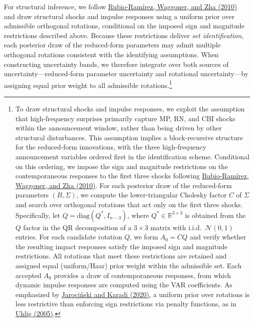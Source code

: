 \documentclass[12pt, reqno]{article}
\begin{document}
For structural inference, we follow \hyperlink{Rubio-Ramirez et al. (2010)}{Rubio-Ramírez, Waggoner, and Zha (2010)} and draw structural shocks and impulse responses using a uniform prior over admissible orthogonal rotations, conditional on the imposed sign and magnitude restrictions described above. Because these restrictions deliver \emph{set identification}, each posterior draw of the reduced-form parameters may admit multiple orthogonal rotations consistent with the identifying assumptions. When constructing uncertainty bands, we therefore integrate over both sources of uncertainty—reduced-form parameter uncertainty and rotational uncertainty—by assigning equal prior weight to all admissible rotations.\footnote{To draw structural shocks and impulse responses, we exploit the assumption that high-frequency surprises primarily capture MP, RN, and CBI shocks within the announcement window, rather than being driven by other structural disturbances. This assumption implies a block-recursive structure for the reduced-form innovations, with the three high-frequency announcement variables ordered first in the identification scheme. Conditional on this ordering, we impose the sign and magnitude restrictions on the contemporaneous responses to the first three shocks following \hyperlink{Rubio-Ramirez et al. (2010)}{Rubio-Ramírez, Waggoner, and Zha (2010)}. For each posterior draw of the reduced-form parameters $(B,\Sigma)$, we compute the lower-triangular Cholesky factor $C$ of $\Sigma$ and search over orthogonal rotations that act only on the first three shocks. Specifically, let $Q=\mathrm{diag}(Q^{\ast}, I_{n-3})$, where $Q^{\ast}\in\mathbb{R}^{3\times3}$ is obtained from the $Q$ factor in the QR decomposition of a $3\times3$ matrix with i.i.d.\ $\mathcal{N}(0,1)$ entries. For each candidate rotation $Q$, we form $A_0 = C Q$ and verify whether the resulting impact responses satisfy the imposed sign and magnitude restrictions. All rotations that meet these restrictions are retained and assigned equal (uniform/Haar) prior weight within the admissible set. Each accepted $A_0$ provides a draw of contemporaneous responses, from which dynamic impulse responses are computed using the VAR coefficients. As emphasized by \hyperlink{Jarociński and Karadi (2020)}{Jarociński and Karadi (2020)}, a uniform prior over rotations is less restrictive than enforcing sign restrictions via penalty functions, as in \hyperlink{Uhlig (2005)}{Uhlig (2005)}.}
\end{document}
